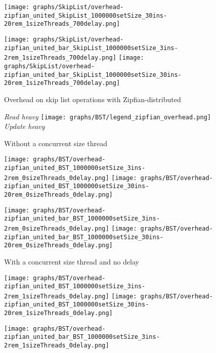 \documentclass{article}
\begin{document}
\begin{figure*}[htbp]
	\texttt{[image: graphs/SkipList/overhead-zipfian\_united\_SkipList\_1000000setSize\_30ins-20rem\_1sizeThreads\_700delay.png]}\par
	\texttt{[image: graphs/SkipList/overhead-zipfian\_united\_bar\_SkipList\_1000000setSize\_3ins-2rem\_1sizeThreads\_700delay.png]}\hspace{2.5em}
	\texttt{[image: graphs/SkipList/overhead-zipfian\_united\_bar\_SkipList\_1000000setSize\_30ins-20rem\_1sizeThreads\_700delay.png]}\par
	\caption{Overhead on skip list operations with Zipfian-distributed}
	\label{fig:SkipList zipfian overhead}
\end{figure*}

\begin{figure*}[htbp]
	\centering
	\medskip
	\textit{Read heavy}\quad\quad
	\texttt{[image: graphs/BST/legend\_zipfian\_overhead.png]}\quad\quad
	\textit{Update heavy}\par
	\medskip
	Without a concurrent size thread\par
        \smallskip
	\texttt{[image: graphs/BST/overhead-zipfian\_united\_BST\_1000000setSize\_3ins-2rem\_0sizeThreads\_0delay.png]}\hspace{2.5em}
	\texttt{[image: graphs/BST/overhead-zipfian\_united\_BST\_1000000setSize\_30ins-20rem\_0sizeThreads\_0delay.png]}\par
	\texttt{[image: graphs/BST/overhead-zipfian\_united\_bar\_BST\_1000000setSize\_3ins-2rem\_0sizeThreads\_0delay.png]}\hspace{2.5em}
	\texttt{[image: graphs/BST/overhead-zipfian\_united\_bar\_BST\_1000000setSize\_30ins-20rem\_0sizeThreads\_0delay.png]}\par
	\medskip
	With a concurrent size thread and no delay\par
	\texttt{[image: graphs/BST/overhead-zipfian\_united\_BST\_1000000setSize\_3ins-2rem\_1sizeThreads\_0delay.png]}\hspace{2.5em}
	\texttt{[image: graphs/BST/overhead-zipfian\_united\_BST\_1000000setSize\_30ins-20rem\_1sizeThreads\_0delay.png]}\par
	\texttt{[image: graphs/BST/overhead-zipfian\_united\_bar\_BST\_1000000setSize\_3ins-2rem\_1sizeThreads\_0delay.png]}\hspace{2.5em}

\end{figure*}
\end{document}
